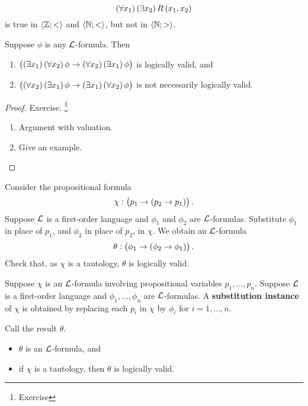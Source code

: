\begin{example}
$$ \fab{x_1}\teb{x_2}R\br{x_1, x_2} $$
is true in $ \left\langle \mathbb{Z}; < \right\rangle $ and $ \left\langle \mathbb{N}; < \right\rangle $, but not in $ \left\langle \mathbb{N}; > \right\rangle $.
\end{example}

\begin{example}
Suppose $ \phi $ is any $ \mathcal{L} $-formula. Then
\begin{enumerate}
\item $ \impb{\teb{x_1}\fab{x_2}\phi}{\fab{x_2}\teb{x_1}\phi} $ is logically valid, and
\item $ \impb{\fab{x_2}\teb{x_1}\phi}{\teb{x_1}\fab{x_2}\phi} $ is not necessarily logically valid.
\end{enumerate}
\end{example}

\begin{proof}
Exercise. \footnote{Exercise}
\begin{enumerate}
\item Argument with valuation.
\item Give an example.
\end{enumerate}
\end{proof}

\begin{example*}
Consider the propositional formula
$$ \chi : \impb{p_1}{\impb{p_2}{p_1}}. $$
Suppose $ \mathcal{L} $ is a first-order language and $ \phi_1 $ and $ \phi_2 $ are $ \mathcal{L} $-formulas. Substitute $ \phi_1 $ in place of $ p_1 $, and $ \phi_2 $ in place of $ p_2 $, in $ \chi $. We obtain an $ \mathcal{L} $-formula
$$ \theta : \impb{\phi_1}{\impb{\phi_2}{\phi_1}}. $$
Check that, as $ \chi $ is a tautology, $ \theta $ is logically valid.
\end{example*}

\begin{definition}
Suppose $ \chi $ is an $ \mathcal{L} $-formula involving propositional variables $ p_1, \dots, p_n $. Suppose $ \mathcal{L} $ is a first-order language and $ \phi_1, \dots, \phi_n $ are $ \mathcal{L} $-formulas. A \textbf{substitution instance} of $ \chi $ is obtained by replacing each $ p_i $ in $ \chi $ by $ \phi_i $ for $ i = 1, \dots, n $.
\end{definition}

Call the result $ \theta $.

\pagebreak

\begin{theorem}
\hfill
\begin{itemize}
\item $ \theta $ is an $ \mathcal{L} $-formula, and
\item if $ \chi $ is a tautology, then $ \theta $ is logically valid.
\end{itemize}
\end{theorem}

